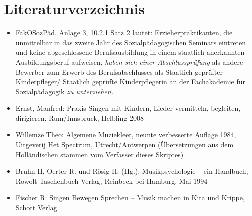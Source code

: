 \documentclass[10pt,a4paper,twoside]{report}
\begin{document}
\chapter*{Literaturverzeichnis}
\begin{itemize}
\item FakOSozPäd. Anlage 3, 10.2.1 Satz 2 lautet:
\glqq Erzieherpraktikanten, die unmittelbar in das zweite Jahr des Sozialpädagogischen Seminars eintreten und keine abgeschlossene Berufsausbildung in einem staatlich anerkannten Ausbildungsberuf aufweisen, \emph{haben sich einer Ab\-schluss\-prüfung} als andere Bewerber zum Erwerb des Berufsabschlusses als Staatlich ge\-prüf\-ter Kinderpfleger/ Staatlich geprüfte Kinderpflegerin an der Fach\-aka\-demie für Sozialpädagogik \emph{zu unter\-zie\-hen.\grqq}

\item Ernst, Manfred: Praxis Singen mit Kindern, Lieder vermitteln, begleiten, dirigieren. Rum/Innsbruck, Helbling 2008

\item Willemze Theo: Algemene Muziekleer, neunte verbesserte Auflage 1984, Uitgeverij Het Spectrum, Utrecht/Antwerpen (Übersetzungen aus dem Holländischen stammen vom Verfasser dieses Skriptes)

\item Bruhn H, Oerter R. und Rösig H. (Hg.): Musikpsychologie -- ein Handbuch, Rowolt Taschenbuch 
Verlag, Reinbeck bei Hamburg, Mai 1994

\item Fischer R: Singen Bewegen Sprechen -- Musik machen in Kita und Krippe, Schott Verlag
\end{itemize}
\newpage
\ 
\end{document}
